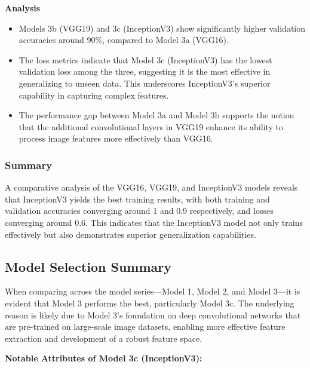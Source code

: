 \textbf{Analysis}
\begin{itemize}
    \item Models 3b (VGG19) and 3c (InceptionV3) show significantly higher validation accuracies around 90\%, compared to Model 3a (VGG16).
    \item The loss metrics indicate that Model 3c (InceptionV3) has the lowest validation loss among the three, suggesting it is the most effective in generalizing to unseen data. This underscores InceptionV3's superior capability in capturing complex features.
    \item The performance gap between Model 3a and Model 3b supports the notion that the additional convolutional layers in VGG19 enhance its ability to process image features more effectively than VGG16.
\end{itemize}


\subsubsection{Summary}

A comparative analysis of the VGG16, VGG19, and InceptionV3 models reveals that InceptionV3 yields the best training results, with both training and validation accuracies converging around 1 and 0.9 respectively, and losses converging around 0.6. This indicates that the InceptionV3 model not only trains effectively but also demonstrates superior generalization capabilities.

\subsection{Model Selection Summary}
When comparing across the model series—Model 1, Model 2, and Model 3—it is evident that Model 3 performs the best, particularly Model 3c. The underlying reason is likely due to Model 3's foundation on deep convolutional networks that are pre-trained on large-scale image datasets, enabling more effective feature extraction and development of a robust feature space.

\textbf{Notable Attributes of Model 3c (InceptionV3):}

